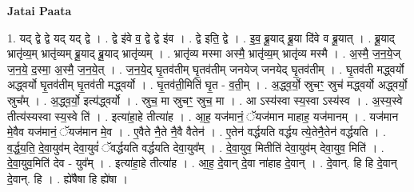 \documentclass[17pt]{extarticle}
\begin{document}
\textbf{Jatai Paata} \newline

1. यद् द्वे द्वे यद् यद् द्वे । . द्वे इ॑वे व॒ द्वे द्वे इ॑व । . द्वे इति॒ द्वे । . इ॒व॒ ब्रू॒याद् ब्रू॒या दि॑वे व ब्रू॒यात् । . ब्रू॒याद् भ्रातृ॑व्य॒म् भ्रातृ॑व्यम् ब्रू॒याद् ब्रू॒याद् भ्रातृ॑व्यम् । . भ्रातृ॑व्य मस्मा अस्मै॒ भ्रातृ॑व्य॒म् भ्रातृ॑व्य मस्मै । . अ॒स्मै॒ ज॒न॒ये॒ज् ज॒न॒ये॒ द॒स्मा॒ अ॒स्मै॒ ज॒न॒ये॒त् । . ज॒न॒ये॒द् घृ॒तव॑तीम् घृ॒तव॑तीम् जनयेज् जनयेद् घृ॒तव॑तीम् । . घृ॒तव॑ती मद्ध्वर्यो अद्ध्वर्यो घृ॒तव॑तीम् घृ॒तव॑ती मद्ध्वर्यो । . घृ॒तव॑ती॒मिति॑ घृ॒त - व॒ती॒म् । . अ॒द्ध्व॒र्यो॒ स्रुचꣳ॒॒ स्रुच॑ मद्ध्वर्यो अद्ध्वर्यो॒ स्रुच᳚म् । . अ॒द्ध्व॒र्यो॒ इत्य॑द्ध्वर्यो । . स्रुच॒ मा स्रुचꣳ॒॒ स्रुच॒ मा । . आ ऽस्य॑स्वा स्य॒स्वा ऽस्य॑स्व । . अ॒स्य॒स्वे तीत्य॑स्यस्वा स्य॒स्वे ति॑ । . इत्या॑हा॒हे तीत्या॑ह । . आ॒ह॒ यज॑मानं॒ ॅयज॑मान माहाह॒ यज॑मानम् । . यज॑मान मे॒वैव यज॑मानं॒ ॅयज॑मान मे॒व । . ए॒वैते नै॒ते नै॒वै वैतेन॑ । . ए॒तेन॑ वर्द्धयति वर्द्धय त्ये॒तेनै॒तेन॑ वर्द्धयति । . व॒र्द्ध॒य॒ति॒ दे॒वा॒युव॑म् देवा॒युवं॑ ॅवर्द्धयति वर्द्धयति देवा॒युव᳚म् । . दे॒वा॒युव॒ मितीति॑ देवा॒युव॑म् देवा॒युव॒ मिति॑ । . दे॒वा॒युव॒मिति॑ देव - युव᳚म् । . इत्या॑हा॒हे तीत्या॑ह । . आ॒ह॒ दे॒वान् दे॒वा ना॑हाह दे॒वान् । . दे॒वान्. हि हि दे॒वान् दे॒वान्. हि । . ह्ये॑षैषा हि ह्ये॑षा । \newline
\end{document}
